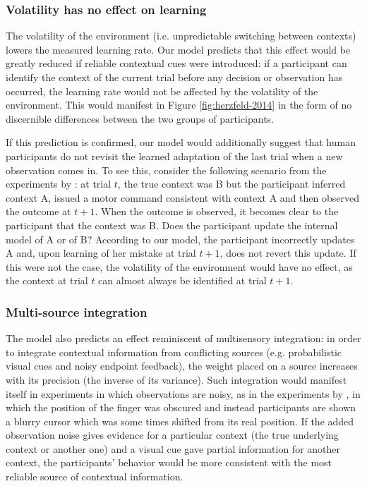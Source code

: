 \documentclass[a4paper,doc,floatsintext,natbib]{apa6}
\def \fref #1{Figure \ref{#1}}     %
\begin{document}
\subsubsection{Volatility has no effect on learning}
The volatility of the environment (i.e. unpredictable switching between contexts) lowers the measured learning rate. Our model predicts that this effect would be greatly reduced if reliable contextual cues were introduced: if a participant can identify the context of the current trial before any decision or observation has occurred, the learning rate would not be affected by the volatility of the environment. This would manifest in \fref{fig:herzfeld-2014} in the form of no discernible differences between the two groups of participants.

If this prediction is confirmed, our model would additionally suggest that human participants do not revisit the learned adaptation of the last trial when a new observation comes in. To see this, consider the following scenario from the experiments by \cite{Herzfeld_memory_2014}: at trial $t$, the true context was B but the participant inferred context A, issued a motor command consistent with context A and then observed the outcome at $t + 1$. When the outcome is observed, it becomes clear to the participant that the context was B. Does the participant update the internal model of A or of B? According to our model, the participant incorrectly updates A and, upon learning of her mistake at trial $t+1$, does not revert this update. If this were not the case, the volatility of the environment would have no effect, as the context at trial $t$ can almost always be identified at trial $t+1$.

\subsubsection{Multi-source integration}
The model also predicts an effect reminiscent of multisensory integration: in order to integrate contextual information from conflicting sources (e.g. probabilistic visual cues and noisy endpoint feedback), the weight placed on a source increases with its precision (the inverse of its variance). Such integration would manifest itself in experiments in which observations are noisy, as in the experiments by \cite{Kording_Bayesian_2004}, in which the position of the finger was obscured and instead participants are shown a blurry cursor which was some times shifted from its real position. If the added observation noise gives evidence for a particular context (the true underlying context or another one) and a visual cue gave partial information for another context, the participants' behavior would be more consistent with the most reliable source of contextual information.
\end{document}
